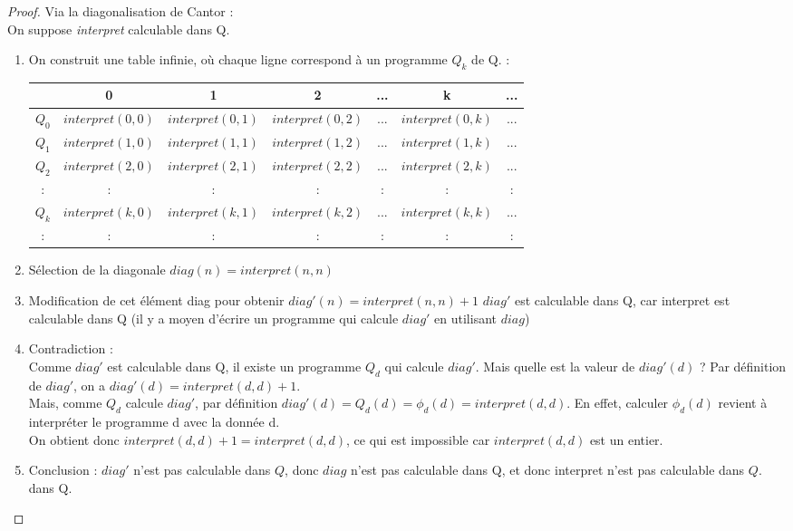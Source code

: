 \begin{proof} Via la diagonalisation de Cantor : \\
On suppose \textit{interpret} calculable dans Q.
\begin{enumerate}
	\item On construit une table infinie, où chaque ligne correspond à un programme $Q_k$ de Q.   : \\
		\begin{tabular}{|c||c|c|c|c|c|c|}
			\hline
			& 0 & 1 & 2 & ... & k & ... \\
			\hline
			$Q_0$ & $interpret(0,0)$ & $interpret(0,1)$ & $interpret(0,2)$ & ... & $interpret(0,k)$ & ... \\
			$Q_1$ & $interpret(1,0)$ & $interpret(1,1)$ & $interpret(1,2)$ & ... & $interpret(1,k)$ & ... \\
			$Q_2$ & $interpret(2,0)$ & $interpret(2,1)$ & $interpret(2,2)$ & ... & $interpret(2,k)$ & ... \\
			: & : &:& : & : & : &:\\
			$Q_k$ & $interpret(k,0)$ & $interpret(k,1)$ & $interpret(k,2)$ & ... & $interpret(k,k)$ & ... \\
			: & : &:& : & : & : &:\\
			\hline
		\end{tabular}
	\item Sélection de la diagonale
		$diag(n) = interpret(n,n)$
	\item Modification de cet élément diag pour obtenir
		$diag'(n) = interpret(n,n)+1$
		$diag'$ est calculable dans Q, car interpret est calculable dans Q (il y a moyen
		d'écrire un programme qui calcule $diag'$ en utilisant $diag$)

	\item Contradiction :\\
	       	Comme $diag'$ est calculable dans Q, il existe un programme $Q_d$ qui calcule $diag'$.  
		Mais quelle est la valeur de $diag'(d)$ ?
		Par définition de $diag'$, on a $diag'(d) = interpret(d,d)+1$. \\
		Mais, comme $Q_d$ calcule $diag'$, par définition $diag'(d) = Q_d(d) = \phi_d(d) = interpret(d,d)$.
		En effet, calculer $\phi_d(d)$ revient à interpréter le programme
		d avec la donnée d. \\
		On obtient donc $interpret(d,d)+1 = interpret(d,d)$, ce qui est impossible car $interpret(d,d)$ est un entier. 
	\item Conclusion : $diag'$ n'est pas calculable dans $Q$, donc $diag$
	n'est pas calculable dans Q, et donc interpret n'est pas calculable dans $Q$.
dans Q.
\end{enumerate}
\end{proof}

